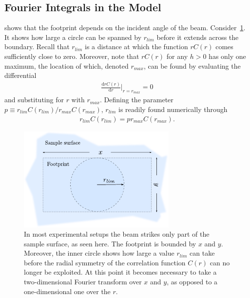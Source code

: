 \documentclass[10pt,twoside, b5paper,pdftex]{report}
\begin{document}
\subsection{Fourier Integrals in the Model}
 shows that the footprint depends on the incident angle of the beam. Consider~\cref{fig:footprints}. It shows how large a circle can be spanned by $r_{lim}$ before it extends across the boundary. Recall that $r_{lim}$ is a distance at which the function $rC(r)$ comes sufficiently close to zero. Moreover, note that $rC(r)$ for any $h > 0$ has only one maximum, the location of which, denoted $r_{max}$, can be found by evaluating the differential
\begin{align}
	\frac{\mbox{d}rC(r)}{\mbox{d}r}\Bigg|_{r = r_{max}} = 0
\end{align}
and substituting for $r$ with  $r_{max}$. Defining the parameter $p \equiv r_{lim}C(r_{lim}) / r_{max}C(r_{max})$, $r_{lim}$ is readily found numerically through
\begin{align}
    r_{lim}C(r_{lim}) = p r_{max}C(r_{max}) .
\end{align}
\begin{figure}[htbp]
	\begin{center}
		\includegraphics[width=0.7\textwidth]{figures/fp.pdf}		
	\end{center}
	\caption{In most experimental setups the beam strikes only part of the sample surface, as seen here. The footprint is bounded by $x$ and $y$. Moreover, the inner circle shows how large a value $r_{lim}$ can take before the radial symmetry of the correlation function $C(r)$ can no longer be exploited. At this point it becomes necessary to take a two-dimensional Fourier transform over $x$ and $y$, as opposed to a one-dimensional one over the $r$.\label{fig:footprints}}
\end{figure}
\end{document}
